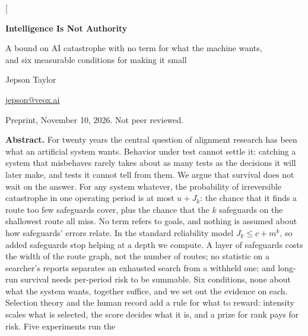 \documentclass[10pt,twocolumn]{article}
\theoremstyle{plain}
\theoremstyle{definition}
\begin{document}
\makeatletter
\twocolumn[
\begin{@twocolumnfalse}
\thispagestyle{plain}
\begin{center}
{\fontsize{26}{30}\selectfont\bfseries Intelligence Is {\color{notred}Not} Authority\par}
\vspace{7pt}
{\fontsize{13}{16.5}\selectfont A bound on AI catastrophe with no term for what the machine wants,\\[1pt]
and six measurable conditions for making it small\par}
\vspace{10pt}
{\large Jepson Taylor\par}
\vspace{2pt}
{\normalsize \href{mailto:jepson@veox.ai}{jepson@veox.ai}\par}
\vspace{3pt}
{\small Preprint, November 10, 2026. Not peer reviewed.\par}
\end{center}
\vspace{2pt}
\begin{center}
\begin{minipage}{0.93\textwidth}
\small
\noindent\textbf{Abstract.}\enspace
For twenty years the central question of alignment research has been what an artificial
system wants. Behavior under test cannot settle it: catching a system that misbehaves rarely
takes about as many tests as the decisions it will later make, and tests it cannot tell from
them. We argue that survival does not wait on the answer. For any system whatever, the
probability of irreversible catastrophe in one operating period is at most $u+J_{k}$: the
chance that it finds a route too few safeguards cover, plus the chance that the $k$
safeguards on the shallowest route all miss. No term refers to goals, and nothing is assumed
about how safeguards' errors relate. In the standard reliability model $J_{k}\le c+m^{k}$, so
added safeguards stop helping at a depth we compute. A layer of safeguards costs the width of
the route graph, not the number of routes; no statistic on a searcher's reports separates an
exhausted search from a withheld one; and long-run survival needs per-period risk to be
summable. Six conditions, none about what the system wants, together suffice, and we set out
the evidence on each. Selection theory and the human record add a rule for what to reward:
intensity scales what is selected, the score decides what it is, and a prize for rank pays
for risk. Five experiments run the

\end{minipage}
\end{center}
\end{@twocolumnfalse}
\end{document}
